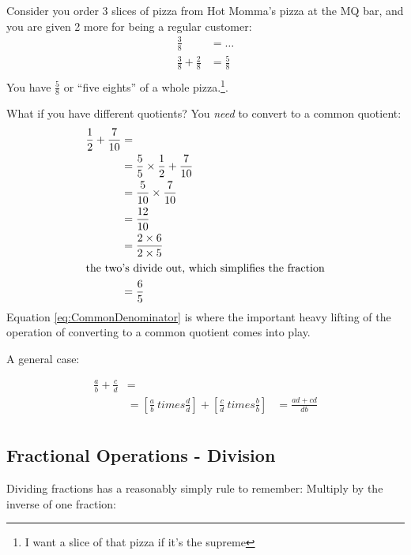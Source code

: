 Consider you order 3 slices of pizza from Hot Momma's pizza at the MQ bar, and
you are given 2 more for being a regular customer:
\begin{align}
  \frac{3}{8} & = \ldots \\
  \frac{3}{8} + \frac{2}{8} & = \frac{5}{8} \\
\end{align}
You have $\frac{5}{8}$ or ``five eights'' of a whole pizza.\footnote{I want a
slice of that pizza if it's the supreme}.

What if you have different quotients? You \emph{need} to convert to a common
quotient:
\begin{align}
 \frac{1}{2} + \frac{7}{10} & = \\
    & = \frac{5}{5} \times \frac{1}{2} + \frac{7}{10} \\
    & = \frac{5}{10} \times \frac{7}{10} \label{eq:CommonDenominator}\\
    & = \frac{12}{10} \\
    & = \frac{2 \times 6}{2 \times 5} \\
  \intertext{the two's divide out, which simplifies the fraction}  
    & = \frac{6}{5} \\
\end{align}
Equation \ref{eq:CommonDenominator} is where the important heavy lifting of the
operation of converting to a common quotient comes into play.

A general case:

\begin{align}
  \frac{a}{b} + \frac{c}{d} & = \\
    & = [\frac{a}{b} \ times \frac{d}{d}] + [\frac{c}{d} \ times \frac{b}{b} ]
    & = \frac{ad + cd}{db} \\
\end{align}

\subsection{Fractional Operations - Division}
\label{sec:FractionalOperationsDivision}
Dividing fractions has a reasonably simply rule to remember: Multiply by the
inverse of one fraction:

